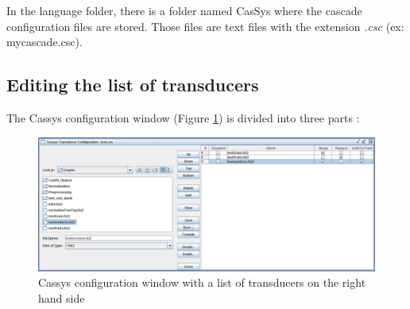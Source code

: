 In the language folder, there is a folder named CasSys where the cascade configuration files are stored. Those files are text files with the extension \textit{.csc} (ex: mycascade.csc).

\subsection{Editing the list of transducers}
\label{subsec:editlistTrans}

The Cassys configuration window (Figure \ref{fig13-03}) is divided into three parts :

\begin{figure}[!htb]
  \centering
  \includegraphics[width=16cm]{resources/img/fig13-03.png}
  \caption{Cassys configuration window with a list of transducers on the right hand side}
  \label{fig13-03}
\end{figure}

